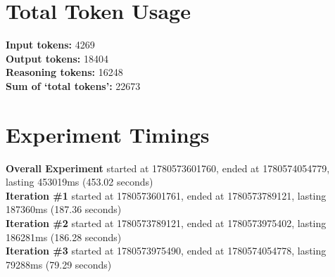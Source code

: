 \documentclass{article}
\begin{document}
\section*{Total Token Usage}
\textbf{Input tokens: }4269
\\\textbf{Output tokens: }18404
\\\textbf{Reasoning tokens: }16248
\\\textbf{Sum of `total tokens': }22673
\section*{Experiment Timings}
\textbf{Overall Experiment} started at 1780573601760, ended at 1780574054779, lasting 453019ms (453.02 seconds)
\\\textbf{Iteration \#1} started at 1780573601761, ended at 1780573789121, lasting 187360ms (187.36 seconds)
\\\textbf{Iteration \#2} started at 1780573789121, ended at 1780573975402, lasting 186281ms (186.28 seconds)
\\\textbf{Iteration \#3} started at 1780573975490, ended at 1780574054778, lasting 79288ms (79.29 seconds)
\end{document}
